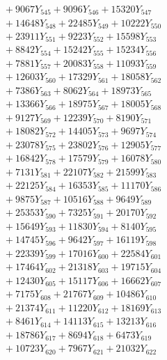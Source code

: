 \documentclass[a4paper,10pt]{article}
\begin{document}
{\begin{align}
&\;  + 9067 Y_{545} + 9096 Y_{546} + 15320 Y_{547} \\[0.3ex]
&\;  + 14648 Y_{548} + 22485 Y_{549} + 10222 Y_{550} \\[0.3ex]
&\;  + 23911 Y_{551} + 9223 Y_{552} + 15598 Y_{553} \\[0.3ex]
&\;  + 8842 Y_{554} + 15242 Y_{555} + 15234 Y_{556} \\[0.3ex]
&\;  + 7881 Y_{557} + 20083 Y_{558} + 11093 Y_{559} \\[0.3ex]
&\;  + 12603 Y_{560} + 17329 Y_{561} + 18058 Y_{562} \\[0.3ex]
&\;  + 7386 Y_{563} + 8062 Y_{564} + 18973 Y_{565} \\[0.3ex]
&\;  + 13366 Y_{566} + 18975 Y_{567} + 18005 Y_{568} \\[0.5ex]\allowbreak
&\;  + 9127 Y_{569} + 12239 Y_{570} + 8190 Y_{571} \\[0.3ex]
&\;  + 18082 Y_{572} + 14405 Y_{573} + 9697 Y_{574} \\[0.3ex]
&\;  + 23078 Y_{575} + 23802 Y_{576} + 12905 Y_{577} \\[0.3ex]
&\;  + 16842 Y_{578} + 17579 Y_{579} + 16078 Y_{580} \\[0.3ex]
&\;  + 7131 Y_{581} + 22107 Y_{582} + 21599 Y_{583} \\[0.3ex]
&\;  + 22125 Y_{584} + 16353 Y_{585} + 11170 Y_{586} \\[0.3ex]
&\;  + 9875 Y_{587} + 10516 Y_{588} + 9649 Y_{589} \\[0.3ex]
&\;  + 25353 Y_{590} + 7325 Y_{591} + 20170 Y_{592} \\[0.3ex]
&\;  + 15649 Y_{593} + 11830 Y_{594} + 8140 Y_{595} \\[0.3ex]
&\;  + 14745 Y_{596} + 9642 Y_{597} + 16119 Y_{598} \\[0.5ex]\allowbreak
&\;  + 22339 Y_{599} + 17016 Y_{600} + 22584 Y_{601} \\[0.3ex]
&\;  + 17464 Y_{602} + 21318 Y_{603} + 19715 Y_{604} \\[0.3ex]
&\;  + 12430 Y_{605} + 15117 Y_{606} + 16662 Y_{607} \\[0.3ex]
&\;  + 7175 Y_{608} + 21767 Y_{609} + 10486 Y_{610} \\[0.3ex]
&\;  + 21374 Y_{611} + 11220 Y_{612} + 18169 Y_{613} \\[0.3ex]
&\;  + 8461 Y_{614} + 14113 Y_{615} + 13213 Y_{616} \\[0.3ex]
&\;  + 18786 Y_{617} + 8694 Y_{618} + 6473 Y_{619} \\[0.3ex]
&\;  + 10723 Y_{620} + 7967 Y_{621} + 21032 Y_{622} \\[0.3ex]

\end{align}}
\end{document}

